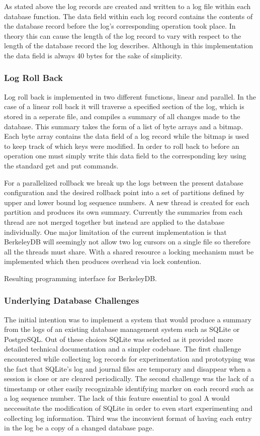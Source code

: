 \documentclass{article}
\begin{document}
As stated above the log records are created and written to a log file within each database function. The data field within each log record contains the contents of the database record before the log's corresponding operation took place. In theory this can cause the length of the log record to vary with respect to the length of the database record the log describes. Although in this implementation the data field is always 40 bytes for the sake of simplicity.

\subsubsection{Log Roll Back}

Log roll back is implemented in two different functions, linear and parallel. 
In the case of a linear roll back it will traverse a specified section of the log, which is stored in a seperate file, and compiles a summary of 
all changes made to the database. This summary takes the form of a list of byte arrays and a bitmap. 
Each byte array contains the data field of a log record while the bitmap is used to keep track of which keys were modified. In order to roll back to before an operation one must simply write this data field to the corresponding key using the standard get and put commands.

For a parallelized rollback we break up the logs between the present database configuration and the desired rollback point into a set of partitions defined by upper and lower bound log sequence numbers. 
A new thread is created for each partition and produces its own summary. Currently the summaries from each thread are not merged together but instead are applied to the database individually. One major limitation of the current implementation is that BerkeleyDB will seemingly not allow two log cursors on a single file so therefore all the threads must share. With a shared resource a locking mechanism must be implemented which then produces overhead via lock contention.


Resulting programming interface for BerkeleyDB.

\subsubsection{Underlying Database Challenges}
The initial intention was to implement a system that would produce a summary from the logs of an existing database management system such as SQLite or PostgreSQL. Out of these choices SQLite was selected as it provided more detailed technical documentation and a simpler codebase. The first challenge encountered while collecting log records for experimentation and prototyping was the fact that SQLite's log and journal files are temporary and disappear when a session is close or are cleared periodically. The second challenge was the lack of a timestamp or other easily recognizable identifying marker on each record such as a log sequence number. The lack of this feature essential to goal A would neccessitate the modification of SQLite in order to even start experimenting and collecting log information. Third was the inconvient format of having each entry in the log be a copy of a changed database page. 
\end{document}
